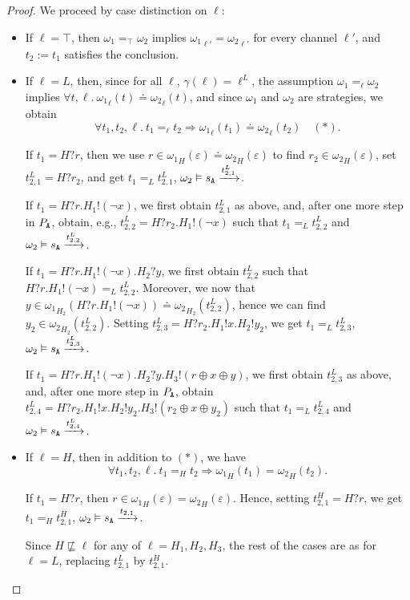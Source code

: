 \documentclass[preprint,5p,twocolumn]{elsarticle}
\begin{document}
\begin{proof}
  We proceed by case distinction on $\ell$:
  \begin{itemize}
  \item If $\ell = \top$, then $\omega_1 =_\top \omega_2$ implies ${\omega_1}_{\ell'} = {\omega_2}_{\ell'}$
    for every channel $\ell'$, and $t_2 := t_1$ satisfies the conclusion.
  \item If $\ell = L$, then, since for all $\ell$, $\gamma(\ell)=\ell^L$, the assumption
    $\omega_1 =_\ell \omega_2$ implies $\forall t, \ell.~{\omega_1}_\ell(t) \doteq {\omega_2}_\ell(t)$,
    and since $\omega_1$ and $\omega_2$ are strategies, we obtain
    $$\forall t_1, t_2, \ell.~t_1 =_\ell t_2 \Longrightarrow {\omega_1}_\ell(t_1) \doteq {\omega_2}_\ell(t_2)\quad(*).$$

    If $t_1 = H?r$, then we use $r \in {\omega_1}_{H}(\varepsilon) \doteq {\omega_2}_{H}(\varepsilon)$ to find
    $r_2 \in {\omega_2}_H(\varepsilon)$, set $t^L_{2,1} = H ? r_2$, and get $t_1 =_L t^L_{2,1}$, $\omega_2 \vDash s_{\mathtt{A}}  \xrightarrow{t^L_{2,1}}$.

    If $t_1 = H?r.H_1!(\neg x)$, we first obtain $t^L_{2,1}$ as above, and, after one more step in $P_{\mathtt{A}}$,
    obtain, e.g., $t^L_{2,2}=H?r_2.H_1!(\neg x)$ such that $t_1 =_L t^L_{2,2}$ and $\omega_2 \vDash s_{\mathtt{A}}  \xrightarrow{t^L_{2,2}}$.

    If $t_1 = H?r.H_1!(\neg x).H_2?y$, we first obtain $t^L_{2,2}$ such that $H?r.H_1!(\neg x) =_L t^L_{2,2}$. Moreover,
    we now that $y \in {\omega_1}_{H_2}(H?r.H_1!(\neg x)) \doteq {\omega_2}_{H_2}(t^L_{2,2})$, hence we can
    find $y_2 \in {\omega_2}_{H_2}(t^L_{2,2})$. Setting $t^L_{2,3}=H?r_2.H_1!x.H_2!y_2$, we get $t_1 =_L t^L_{2,3}$,
    $\omega_2 \vDash s_{\mathtt{A}}  \xrightarrow{t^L_{2,3}}$.

    If $t_1 = H?r.H_1!(\neg x).H_2?y.H_3!(r \oplus x \oplus y)$, we first obtain $t^L_{2,3}$ as above, and, after one more step in $P_{\mathtt{A}}$,
    obtain $t^L_{2,4}=H?r_2.H_1!x.H_2!y_2.H_3!(r_2\oplus x\oplus y_2)$ such that $t_1 =_L t^L_{2,4}$ and $\omega_2 \vDash s_{\mathtt{A}}  \xrightarrow{t^L_{2,4}}$.
  \item If  $\ell = H$, then in addition to $(*)$, we have
    $$\forall t_1,t_2,\ell.~t_1 =_H t_2 \Longrightarrow {\omega_1}_H(t_1) = {\omega_2}_H(t_2).$$

    If $t_1 = H?r$, then $r \in {\omega_1}_{H}(\varepsilon) = {\omega_2}_{H}(\varepsilon)$.
    Hence, setting $t^H_{2,1} = H ? r$, we get $t_1 =_H t^H_{2,1}$, $\omega_2 \vDash s_{\mathtt{A}}  \xrightarrow{t_{2,1}}$.

    Since $H \not\sqsubseteq \ell$ for any of $\ell = H_1,H_2,H_3$, the rest of the cases are as for $\ell =L$, replacing $t^L_{2,1}$ by $t^H_{2,1}$.


\end{itemize}
\end{proof}
\end{document}
